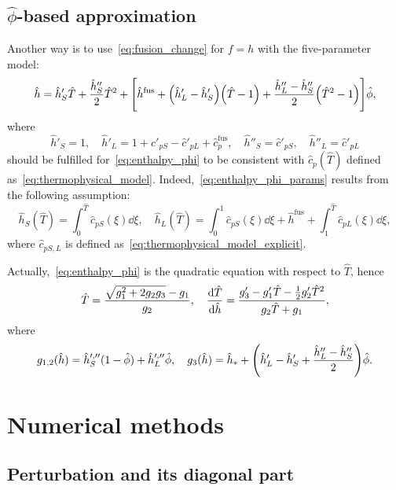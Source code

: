 \documentclass{article}
\newcommand{\fusion}[1]{{#1}^\mathrm{fus}}
\newcommand{\Hh}{\hat{h}}
\newcommand{\HT}{\hat{T}}
\newcommand{\Hc}{\hat{c}}
\newcommand{\Hphi}{\hat{\phi}}
\begin{document}
\subsection{\(\hat\phi\)-based approximation}

Another way is to use~\eqref{eq:fusion_change} for \(f=h\) with the five-parameter model:
\begin{equation}\label{eq:enthalpy_phi}
	\Hh = \Hh'_S\HT + \frac{\Hh''_S}2\HT^2 + \qty[
	    \fusion{\Hh} + \qty(\Hh'_L-\Hh'_S) \qty(\HT-1) + \frac{\Hh''_L-\Hh''_S}2 \qty( \HT^2-1 )
	]\Hphi,
\end{equation}
where
\begin{equation}\label{eq:enthalpy_phi_params}
	\Hh'_S = 1, \quad \Hh'_L = 1 + \Hc'_{pS} - \Hc'_{pL} + \fusion{\Hc}_p, \quad
	\Hh''_S = \Hc'_{pS}, \quad \Hh''_L = \Hc'_{pL}
\end{equation}
should be fulfilled for~\eqref{eq:enthalpy_phi} to be consistent with \(\Hc_p(\HT)\)
defined as~\eqref{eq:thermophysical_model}.
Indeed,~\eqref{eq:enthalpy_phi_params} results from the following assumption:
\begin{equation}\label{eq:enthalpy_phi_explicit}
	\Hh_S(\HT) = \int_0^{\HT} \Hc_{pS}(\xi)\dd{\xi}, \quad
	\Hh_L(\HT) = \int_0^1 \Hc_{pS}(\xi)\dd{\xi} + \fusion{\Hh} + \int_1^{\HT} \Hc_{pL}(\xi)\dd{\xi},
\end{equation}
where \(\Hc_{pS,L}\) is defined as~\eqref{eq:thermophysical_model_explicit}.

Actually,~\eqref{eq:enthalpy_phi} is the quadratic equation with respect to \(\HT\), hence
\begin{equation}\label{eq:temp_phi}
	\HT = \frac{\sqrt{g_1^2 + 2g_2g_3}-g_1}{g_2}, \quad
	\dv{\HT}{\Hh} = \frac{g_3' - g_1'\HT - \frac12g_2'\HT^2}{g_2\HT + g_1},
\end{equation}
where
\begin{equation}\label{eq:enthalpy3_phi}
    g_{1,2}(\Hh) = \Hh_S^{\prime,\prime\prime} (1-\hat\phi) + \Hh_L^{\prime,\prime\prime}\hat\phi, \quad
	g_3(\Hh) = \Hh_* + \qty(\Hh_L' - \Hh_S' + \frac{\Hh_L'' - \Hh_S''}2)\Hphi.
\end{equation}

\section{Numerical methods}

\subsection{Perturbation and its diagonal part}
\end{document}
